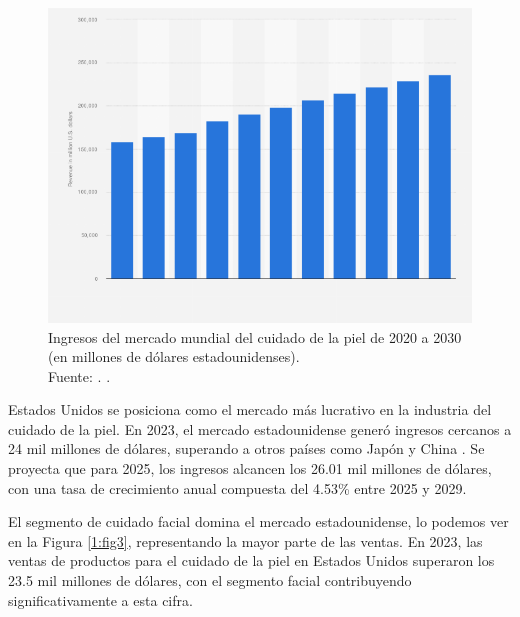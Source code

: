 \begin{figure}[!ht]
	\begin{center}
		\includegraphics[width=1\textwidth]{1/figures/cap1global.png}
		\caption[Ingresos del mercado mundial del cuidado de la piel de 2020 a 2030 (en millones de dólares estadounidenses)]{Ingresos del mercado mundial del cuidado de la piel de 2020 a 2030 (en millones de dólares estadounidenses).\\
			Fuente: \cite{statista2023global}. .}
		\label{1:fig2}
	\end{center}
\end{figure}

Estados Unidos se posiciona como el mercado más lucrativo en la industria del cuidado de la piel. En 2023, el mercado estadounidense generó ingresos cercanos a 24 mil millones de dólares, superando a otros países como Japón y China . Se proyecta que para 2025, los ingresos alcancen los 26.01 mil millones de dólares, con una tasa de crecimiento anual compuesta del 4.53\% entre 2025 y 2029. \parencite{statista2023us}

El segmento de cuidado facial domina el mercado estadounidense, lo podemos ver en la Figura \ref{1:fig3}, representando la mayor parte de las ventas. En 2023, las ventas de productos para el cuidado de la piel en Estados Unidos superaron los 23.5 mil millones de dólares, con el segmento facial contribuyendo significativamente a esta cifra. \parencite{statista2025usforecast}

